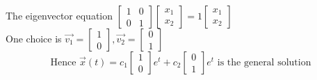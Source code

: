 \begin{enumerate}[label=\protect\circled{\arabic*}]
\begin{example-N}
		The eigenvector equation $\begin{bmatrix}
			1 & 0 \\ 0 & 1
		\end{bmatrix} \begin{bmatrix}
			x_1 \\ x_2
		\end{bmatrix} = 1 \begin{bmatrix}
			x_1\\x_2
		\end{bmatrix}$\\
		One choice is $\vec{v_1} = \begin{bmatrix}
			1 \\ 0 
		\end{bmatrix}, \vec{v_2} = \begin{bmatrix}
			0 \\ 1
		\end{bmatrix}$
		\begin{equation*}
			\text{Hence } \vec{x}(t) = c_1 \begin{bmatrix}
			1 \\ 0 
		\end{bmatrix} e^t + c_2 \begin{bmatrix}
			0 \\ 1 
		\end{bmatrix} e^t \text{ is the general solution}
		\end{equation*} 
	\end{example-N}
\end{enumerate}
